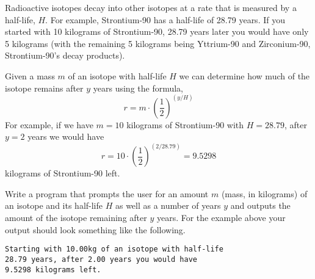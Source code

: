 \begin{exer}
Radioactive isotopes decay into other isotopes at a rate that is
measured by a half-life, $H$.  For example, Strontium-90 has a half-life
of 28.79 years.  If you started with 10 kilograms of Strontium-90, 28.79
years later you would have only 5 kilograms (with the remaining 5 kilograms
being Yttrium-90 and Zirconium-90, Strontium-90's decay products).

Given a mass $m$ of an isotope with half-life $H$ we can determine
how much of the isotope remains after $y$ years using the formula,
  $$r = m \cdot \left(\frac{1}{2}\right)^{(y/H)}$$
For example, if we have $m = 10$ kilograms of Strontium-90 with $H = 28.79$, 
after $y = 2$ years we would have 
  $$r = 10 \cdot \left(\frac{1}{2}\right)^{(2/28.79)} = 9.5298$$
kilograms of Strontium-90 left.

Write a program that prompts the user for an amount $m$ (mass, in kilograms) 
of an isotope and its half-life $H$ as well as a number of years $y$ and 
outputs the amount of the isotope remaining after $y$ years.  For the
example above your output should look something like the following.

\begin{verbatim}
Starting with 10.00kg of an isotope with half-life
28.79 years, after 2.00 years you would have
9.5298 kilograms left.
\end{verbatim}
\end{exer}





